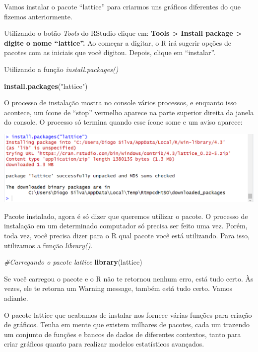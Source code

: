 \documentclass[
]{book}
\newenvironment{Shaded}{\begin{snugshade}}{\end{snugshade}}
\newcommand{\CommentTok}[1]{\textcolor[rgb]{0.56,0.35,0.01}{\textit{#1}}}
\newcommand{\FunctionTok}[1]{\textcolor[rgb]{0.13,0.29,0.53}{\textbf{#1}}}
\newcommand{\NormalTok}[1]{#1}
\newcommand{\StringTok}[1]{\textcolor[rgb]{0.31,0.60,0.02}{#1}}
\begin{document}
Vamos instalar o pacote ``lattice'' para criarmos uns gráficos diferentes do que fizemos anteriormente.

Utilizando o botão \emph{Tools} do RStudio clique em: \textbf{Tools \textgreater{} Install package \textgreater{} digite o nome ``lattice''.} Ao começar a digitar, o R irá sugerir opções de pacotes com as iniciais que você digitou. Depois, clique em ``instalar''.

Utilizando a função \emph{install.packages()}

\begin{Shaded}
\begin{Highlighting}[]
\FunctionTok{install.packages}\NormalTok{(}\StringTok{"lattice"}\NormalTok{)}
\end{Highlighting}
\end{Shaded}

O processo de instalação mostra no console vários processos, e enquanto isso acontece, um ícone de ``stop'' vermelho aparece na parte superior direita da janela do console. O processo só termina quando esse ícone some e um aviso aparece:

\includegraphics{img/install_package.png}

Pacote instalado, agora é só dizer que queremos utilizar o pacote. O processo de instalação em um determinado computador só precisa ser feito uma vez. Porém, toda vez, você precisa dizer para o R qual pacote você está utilizando. Para isso, utilizamos a função \emph{library()}.

\begin{Shaded}
\begin{Highlighting}[]
\CommentTok{\#Carregando o pacote lattice}
\FunctionTok{library}\NormalTok{(lattice)}
\end{Highlighting}
\end{Shaded}

Se você carregou o pacote e o R não te retornou nenhum erro, está tudo certo. Às vezes, ele te retorna um Warning message, também está tudo certo. Vamos adiante.

O pacote lattice que acabamos de instalar nos fornece várias funções para criação de gráficos. Tenha em mente que existem milhares de pacotes, cada um trazendo um conjunto de funções e bancos de dados de diferentes contextos, tanto para criar gráficos quanto para realizar modelos estatísticos avançados.
\end{document}
